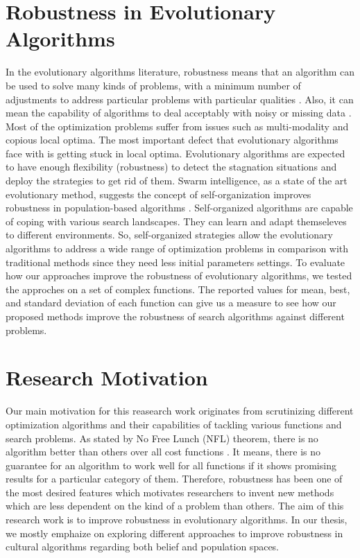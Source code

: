 \section{Robustness in Evolutionary Algorithms}
In the evolutionary algorithms literature, robustness means that an algorithm can be used to solve many kinds of problems, with a minimum number of adjustments to address particular problems with particular qualities \cite{che2010robust}. Also, it can mean the capability of algorithms to deal acceptably with noisy or missing data \cite{kennedy2001swarm}. Most of the optimization problems suffer from issues such as multi-modality and copious local optima. The most important defect that evolutionary algorithms face with is getting stuck in local optima. Evolutionary algorithms are expected to have enough flexibility (robustness) to detect the stagnation situations and deploy the strategies to get rid of them.\newline
Swarm intelligence, as a state of the art evolutionary method, suggests the concept of self-organization improves robustness in population-based algorithms \cite{blum2015swarm}. Self-organized algorithms are capable of coping with various search landscapes. They can learn and adapt themseleves to different environments. So, self-organized strategies allow the evolutionary algorithms to address a wide range of optimization problems in comparison with traditional methods since they need less initial parameters settings. \newline
To evaluate how our approaches improve the robustness of evolutionary algorithms, we tested the approches on a set of complex functions. The reported values for mean, best, and standard deviation of each function can give us a measure to see how our proposed methods improve the robustness of search algorithms against different problems.
\section{Research Motivation}
Our main motivation for this reasearch work originates from scrutinizing different optimization algorithms and their capabilities of tackling various functions and search problems. As stated by No Free Lunch (NFL) theorem, there is no algorithm better than others over all cost functions \cite{wolpert1997no}. It means, there is no guarantee for an algorithm to work well for all functions if it shows promising results for a particular category of them. Therefore, robustness has been one of the most desired features which motivates researchers to invent new methods which are less dependent on the kind of a problem than others. The aim of this research work is to improve robustness in evolutionary algorithms. In our thesis, we mostly emphaize on exploring different approaches to improve robustness in cultural algorithms regarding both belief and population spaces.\newline
